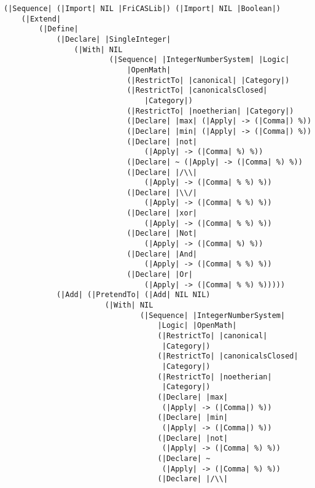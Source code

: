 \documentclass{article}
\begin{document}
\begin{verbatim}
(|Sequence| (|Import| NIL |FriCASLib|) (|Import| NIL |Boolean|)
    (|Extend|
        (|Define|
            (|Declare| |SingleInteger|
                (|With| NIL
                        (|Sequence| |IntegerNumberSystem| |Logic|
                            |OpenMath|
                            (|RestrictTo| |canonical| |Category|)
                            (|RestrictTo| |canonicalsClosed|
                                |Category|)
                            (|RestrictTo| |noetherian| |Category|)
                            (|Declare| |max| (|Apply| -> (|Comma|) %))
                            (|Declare| |min| (|Apply| -> (|Comma|) %))
                            (|Declare| |not|
                                (|Apply| -> (|Comma| %) %))
                            (|Declare| ~ (|Apply| -> (|Comma| %) %))
                            (|Declare| |/\\|
                                (|Apply| -> (|Comma| % %) %))
                            (|Declare| |\\/|
                                (|Apply| -> (|Comma| % %) %))
                            (|Declare| |xor|
                                (|Apply| -> (|Comma| % %) %))
                            (|Declare| |Not|
                                (|Apply| -> (|Comma| %) %))
                            (|Declare| |And|
                                (|Apply| -> (|Comma| % %) %))
                            (|Declare| |Or|
                                (|Apply| -> (|Comma| % %) %)))))
            (|Add| (|PretendTo| (|Add| NIL NIL)
                       (|With| NIL
                               (|Sequence| |IntegerNumberSystem|
                                   |Logic| |OpenMath|
                                   (|RestrictTo| |canonical|
                                    |Category|)
                                   (|RestrictTo| |canonicalsClosed|
                                    |Category|)
                                   (|RestrictTo| |noetherian|
                                    |Category|)
                                   (|Declare| |max|
                                    (|Apply| -> (|Comma|) %))
                                   (|Declare| |min|
                                    (|Apply| -> (|Comma|) %))
                                   (|Declare| |not|
                                    (|Apply| -> (|Comma| %) %))
                                   (|Declare| ~
                                    (|Apply| -> (|Comma| %) %))
                                   (|Declare| |/\\|

\end{verbatim}
\end{document}
